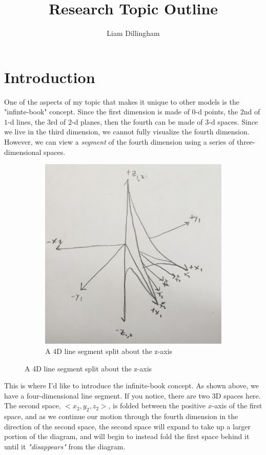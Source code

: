 \documentclass[20pt]{article} %
\title{Research Topic Outline}
\author{Liam Dillingham}
\begin{document}
\maketitle

\section{Introduction}
One of the aspects of my topic that makes it unique to other models is the "infinte-book" concept.  Since the first dimension is made of $0$-d points, the $2$nd of $1$-d lines, the $3$rd of $2$-d planes, then the fourth can be made of $3$-d spaces.  Since we live in the third dimension, we cannot fully visualize the fourth dimension. However, we can view a \textit{segment} of the fourth dimension using a series of three-dimensional spaces.

\begin{figure}[!htbp]
  	\centering
   	\begin{subfigure}[p]{0.5\linewidth}
    	\includegraphics[width=\linewidth]{./figures/fig1.jpg}
	\caption{A 4D line segment split about the z-axis}
	\label{fig:sub1}
   	\end{subfigure}
\end{figure} 

This is where I'd like to introduce the infinite-book concept.  As shown above, we have a four-dimensional line segment. If you notice, there are two 3D spaces here.  
The second space, $<x_2, y_2, z_2>$, is folded between the positive $x$-axis of the first space, and as we continue our motion through the fourth dimension in the direction of the second space, the second space will expand to take up a larger portion of the diagram, and will begin to instead fold the first space behind it until it \textit{"disappears"} from the diagram.
\end{document}
